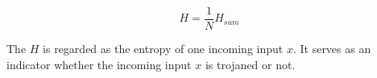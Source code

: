 \documentclass[letterpaper]{article}
\begin{document}
\begin{equation*}
    H = \frac{1}{N} H_{sum}
\end{equation*}

The $H$ is regarded as the entropy of one incoming input $x$. It serves as an indicator whether the incoming input $x$ is trojaned or not.






\end{document}
